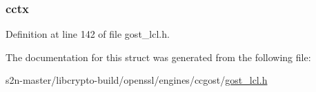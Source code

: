 \subsubsection[{\texorpdfstring{cctx}{cctx}}]{ cctx}\hypertarget{structossl__gost__cipher__ctx_a4536f57bd141b77644121499b784cabf}{}\label{structossl__gost__cipher__ctx_a4536f57bd141b77644121499b784cabf}


Definition at line 142 of file gost\+\_\+lcl.\+h.



The documentation for this struct was generated from the following file\+:\begin{DoxyCompactItemize}
\item 
s2n-\/master/libcrypto-\/build/openssl/engines/ccgost/\hyperlink{gost__lcl_8h}{gost\+\_\+lcl.\+h}\end{DoxyCompactItemize}
